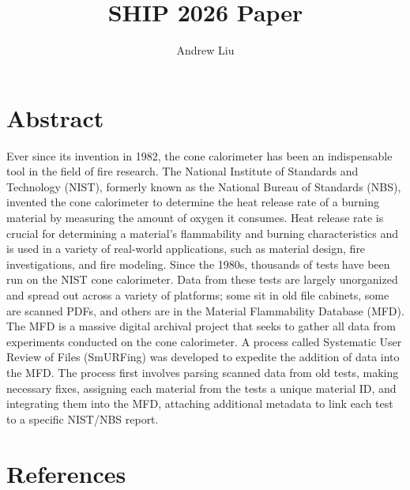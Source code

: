 \documentclass{abstract}
\title{SHIP 2026 Paper }
\author{Andrew Liu}
\begin{document}
\maketitle
\section{Abstract}

Ever since its invention in 1982, the cone calorimeter has been an indispensable tool in the field of fire research. The National Institute of Standards and Technology (NIST), formerly known as the National Bureau of Standards (NBS), invented the cone calorimeter to determine the heat release rate of a burning material by measuring the amount of oxygen it consumes. Heat release rate is crucial for determining a material's flammability and burning characteristics and is used in a variety of real-world applications, such as material design, fire investigations, and fire modeling. Since the 1980s, thousands of tests have been run on the NIST cone calorimeter. Data from these tests are largely unorganized and spread out across a variety of platforms; some sit in old file cabinets, some are scanned PDFs, and others are in the Material Flammability Database (MFD). The MFD is a massive digital archival project that seeks to gather all data from experiments conducted on the cone calorimeter. A process called Systematic User Review of Files (SmURFing) was developed to expedite the addition of data into the MFD. The process first involves parsing scanned data from old tests, making necessary fixes, assigning each material from the tests a unique material ID, and integrating them into the MFD, attaching additional metadata to link each test to a specific NIST/NBS report.




\section{References}
\printbibliography[heading=none]
\end{document}
